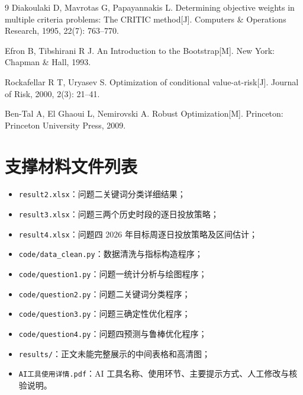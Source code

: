\documentclass[UTF8,a4paper,zihao=-4]{ctexart}
\begin{document}
\begin{thebibliography}{9}
  Diakoulaki D, Mavrotas G, Papayannakis L.
  Determining objective weights in multiple criteria problems: The CRITIC method[J].
  Computers \& Operations Research, 1995, 22(7): 763--770.

  Efron B, Tibshirani R J.
  An Introduction to the Bootstrap[M]. New York: Chapman \& Hall, 1993.

  Rockafellar R T, Uryasev S.
  Optimization of conditional value-at-risk[J].
  Journal of Risk, 2000, 2(3): 21--41.

  Ben-Tal A, El Ghaoui L, Nemirovski A.
  Robust Optimization[M]. Princeton: Princeton University Press, 2009.

\end{thebibliography}

\appendix

\section{支撑材料文件列表}

\begin{itemize}
  \item \texttt{result2.xlsx}：问题二关键词分类详细结果；
  \item \texttt{result3.xlsx}：问题三两个历史时段的逐日投放策略；
  \item \texttt{result4.xlsx}：问题四 2026 年目标周逐日投放策略及区间估计；
  \item \texttt{code/data\_clean.py}：数据清洗与指标构造程序；
  \item \texttt{code/question1.py}：问题一统计分析与绘图程序；
  \item \texttt{code/question2.py}：问题二关键词分类程序；
  \item \texttt{code/question3.py}：问题三确定性优化程序；
  \item \texttt{code/question4.py}：问题四预测与鲁棒优化程序；
  \item \texttt{results/}：正文未能完整展示的中间表格和高清图；
  \item \texttt{AI工具使用详情.pdf}：AI 工具名称、使用环节、主要提示方式、人工修改与核验说明。
\end{itemize}
\end{document}

